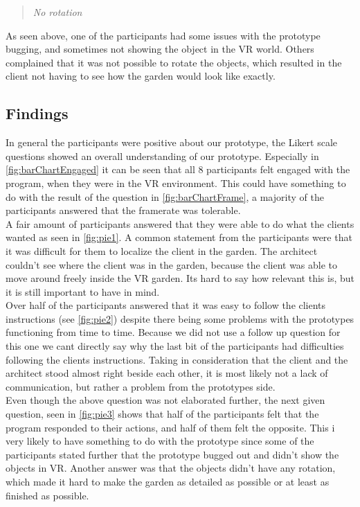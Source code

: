 \begin{quote}
	\textit{No rotation}\\
\end{quote}

As seen above, one of the participants had some issues with the prototype bugging, and sometimes not showing the object in the VR world. Others complained that it was not possible to rotate the objects, which resulted in the client not having to see how the garden would look like exactly.


\subsection{Findings}
In general the participants were positive about our prototype, the Likert scale questions showed an overall understanding of our prototype.
Especially in \autoref{fig:barChartEngaged} it can be seen that all 8 participants felt engaged with the program, when they were in the VR environment. This could have something to do with the result of the question in \autoref{fig:barChartFrame}, a majority of the participants answered that the framerate was tolerable.\\


A fair amount of participants answered that they were able to do what the clients wanted as seen in \ref{fig:pie1}. A common statement from the participants were that it was difficult for them to localize the client in the garden. The architect couldn't see where the client was in the garden, because the client was able to move around freely inside the VR garden. Its hard to say how relevant this is, but it is still important to have in mind.\\


Over half of the participants answered that it was easy to follow the clients instructions (see \autoref{fig:pie2}) despite there being some problems with the prototypes functioning from time to time. Because we did not use a follow up question for this one we cant directly say why the last bit of the participants had difficulties following the clients instructions. Taking in consideration that the client and the architect stood almost right beside each other, it is most likely not a lack of communication, but rather a problem from the prototypes side.\\
Even though the above question was not elaborated further, the next given question, seen in \ref{fig:pie3} shows that half of the participants felt that the program responded to their actions, and half of them felt the opposite. This i very likely to have something to do with the prototype since some of the participants stated further that the prototype bugged out and didn't show the objects in VR. Another answer was that the objects didn't have any rotation, which made it hard to make the garden as detailed as possible or at least as finished as possible.




